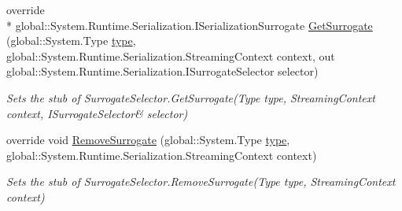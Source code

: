 \begin{DoxyCompactItemize}
override \\*
global\-::\-System.\-Runtime.\-Serialization.\-I\-Serialization\-Surrogate \hyperlink{class_system_1_1_runtime_1_1_serialization_1_1_fakes_1_1_stub_surrogate_selector_ab1fd85fae4a012f8ba0e39821ec91d46}{Get\-Surrogate} (global\-::\-System.\-Type \hyperlink{jquery-1_810_82-vsdoc_8js_a3940565e83a9bfd10d95ffd27536da91}{type}, global\-::\-System.\-Runtime.\-Serialization.\-Streaming\-Context context, out global\-::\-System.\-Runtime.\-Serialization.\-I\-Surrogate\-Selector selector)
\begin{DoxyCompactList}\small\item\em Sets the stub of Surrogate\-Selector.\-Get\-Surrogate(Type type, Streaming\-Context context, I\-Surrogate\-Selector\& selector)\end{DoxyCompactList}\item 
override void \hyperlink{class_system_1_1_runtime_1_1_serialization_1_1_fakes_1_1_stub_surrogate_selector_a7d33b8b3b98c2d9d4a6d1911bd8ad5c0}{Remove\-Surrogate} (global\-::\-System.\-Type \hyperlink{jquery-1_810_82-vsdoc_8js_a3940565e83a9bfd10d95ffd27536da91}{type}, global\-::\-System.\-Runtime.\-Serialization.\-Streaming\-Context context)
\begin{DoxyCompactList}\small\item\em Sets the stub of Surrogate\-Selector.\-Remove\-Surrogate(\-Type type, Streaming\-Context context)\end{DoxyCompactList}\end{DoxyCompactItemize}
